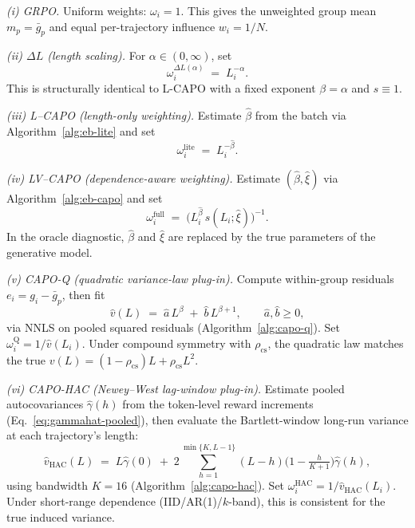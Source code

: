 \emph{(i) GRPO.}
Uniform weights: \(\omega_i = 1\).  This gives the unweighted group mean \(m_p = \bar g_p\) and equal per-trajectory influence \(w_i = 1/N\).

\emph{(ii) \(\Delta L\) (length scaling).}
For \(\alpha\in(0,\infty)\), set
\begin{equation}
  \omega_i^{\Delta L(\alpha)}
  \;=\;
  L_i^{-\alpha}.
  \label{eq:synth_deltal_omega}
\end{equation}
This is structurally identical to L-CAPO with a fixed exponent \(\beta=\alpha\) and \(s\equiv 1\).

\emph{(iii) L--CAPO (length-only weighting).}
Estimate \(\hat\beta\) from the batch via Algorithm~\ref{alg:eb-lite} and set
\begin{equation}
  \omega_i^{\mathrm{lite}}
  \;=\;
  L_i^{-\hat\beta}.
  \label{eq:synth_w_lite}
\end{equation}

\emph{(iv) LV--CAPO (dependence-aware weighting).}
Estimate \((\hat\beta,\hat\xi)\) via Algorithm~\ref{alg:eb-capo} and set
\begin{equation}
  \omega_i^{\mathrm{full}}
  \;=\;
  \big(L_i^{\hat\beta}\,s(L_i;\hat\xi)\big)^{-1}.
  \label{eq:synth_w_full}
\end{equation}
In the oracle diagnostic, \(\hat\beta\) and \(\hat\xi\) are replaced by the true parameters of the generative model.

\emph{(v) CAPO-Q (quadratic variance-law plug-in).}
Compute within-group residuals \(e_i = g_i - \bar g_p\), then fit
\begin{equation}
  \hat v(L)
  \;=\;
  \hat a\,L^{\beta} \;+\; \hat b\,L^{\beta+1},
  \qquad \hat a,\hat b \ge 0,
  \label{eq:synth_w_capoq}
\end{equation}
via NNLS on pooled squared residuals (Algorithm~\ref{alg:capo-q}).  Set \(\omega_i^{\mathrm{Q}} = 1/\hat v(L_i)\).
Under compound symmetry with \(\rho_{\mathrm{cs}}\), the quadratic law matches the true \(v(L) = (1{-}\rho_{\mathrm{cs}})L + \rho_{\mathrm{cs}} L^2\).

\emph{(vi) CAPO-HAC (Newey--West lag-window plug-in).}
Estimate pooled autocovariances \(\hat\gamma(h)\) from the token-level reward increments (Eq.~\ref{eq:gammahat-pooled}), then evaluate the Bartlett-window long-run variance at each trajectory's length:
\begin{equation}
  \hat v_{\mathrm{HAC}}(L)
  \;=\;
  L\hat\gamma(0) \;+\; 2\sum_{h=1}^{\min\{K,L{-}1\}}(L{-}h)\Big(1 - \tfrac{h}{K{+}1}\Big)\hat\gamma(h),
  \label{eq:synth_w_capohac}
\end{equation}
using bandwidth \(K=16\) (Algorithm~\ref{alg:capo-hac}).  Set \(\omega_i^{\mathrm{HAC}} = 1/\hat v_{\mathrm{HAC}}(L_i)\).
Under short-range dependence (IID/AR(1)/\(k\)-band), this is consistent for the true induced variance.

